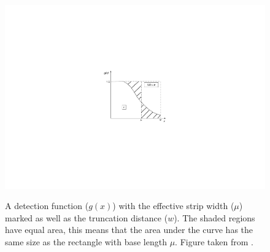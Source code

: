 \begin{figure}
\centering
\includegraphics{intro/figs/muexplanation.pdf}\\
\caption{A detection function ($g(x)$) with the effective strip width ($\mu$) marked as well as the truncation distance ($w$). The shaded regions have equal area, this means that the area under the curve has the same size as the rectangle with base length $\mu$. Figure taken from \cite{IDS}.}
\label{ds-mu-explanation}
\end{figure}

